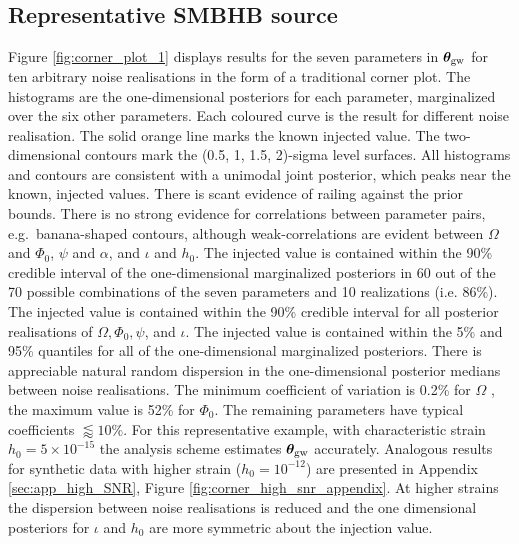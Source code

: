 \documentclass[fleqn,usenatbib,useAMS]{mnras}
\begin{document}
\subsection{Representative SMBHB source}\label{sec:rep_smbh_source}

Figure \ref{fig:corner_plot_1} displays results for the seven parameters in $\boldsymbol{\theta}_{\rm gw}$ for ten arbitrary noise realisations in the form of a traditional corner plot. The histograms are the one-dimensional posteriors for each parameter, marginalized over the six other parameters. Each coloured curve is the result for different noise realisation. The solid orange line marks the known injected value. The two-dimensional contours mark the (0.5, 1, 1.5, 2)-sigma level surfaces. All histograms and contours are consistent with a unimodal joint posterior, which peaks near the known, injected values. There is scant evidence of railing against the prior bounds. There is no strong evidence for correlations between parameter pairs, e.g.\ banana-shaped contours, although weak-correlations are evident between $\Omega$ and $\Phi_0$, $\psi$ and $\alpha$, and $\iota$ and $h_0$. The injected value is contained within the 90\% credible interval of the one-dimensional marginalized posteriors in 60 out of the 70 possible combinations of the seven parameters and 10 realizations (i.e. 86$\%$). The injected value is contained within the 90\% credible interval for all posterior realisations of $\Omega, \Phi_0, \psi$, and  $\iota$. The injected value is contained within the 5\% and 95\% quantiles for all of the one-dimensional marginalized posteriors. There is appreciable natural random dispersion in the one-dimensional posterior medians between noise realisations. The minimum coefficient of variation is  0.2\% for $\Omega$ , the maximum value is 52\% for $\Phi_0$. The remaining parameters have typical coefficients $\lessapprox 10 \%$. For this representative example, with characteristic strain $h_0 = 5 \times 10^{-15}$ the analysis scheme estimates $\boldsymbol{\theta}_{\rm gw}$ accurately. Analogous results for synthetic data with higher strain ($h_0 = 10^{-12}$) are presented in Appendix \ref{sec:app_high_SNR}, Figure \ref{fig:corner_high_snr_appendix}. At higher strains the dispersion between noise realisations is reduced and the one dimensional posteriors for $\iota$ and $h_0$ are more symmetric about the injection value. \newline 
\end{document}
